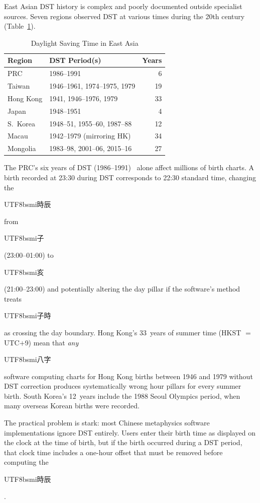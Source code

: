 \documentclass[10pt,a4paper]{article}
\newcommand{\zh}[1]{\begin{CJK}{UTF8}{bsmi}#1\end{CJK}}
\begin{document}
East Asian DST history is complex and poorly documented outside
specialist sources.  Seven regions observed DST at various times during
the 20th century~\cite{iana_tzdata_asia, dst_east_asia_research}
(Table~\ref{tab:dst_history}).

\begin{table}[H]
\centering
\caption{Daylight Saving Time in East Asia}
\label{tab:dst_history}
\small
\begin{tabular}{@{}llr@{}}
\toprule
\textbf{Region} & \textbf{DST Period(s)} & \textbf{Years} \\
\midrule
PRC             & 1986--1991                              & 6  \\
Taiwan          & 1946--1961, 1974--1975, 1979             & 19 \\
Hong Kong       & 1941, 1946--1976, 1979                   & 33 \\
Japan           & 1948--1951                               & 4  \\
S.\ Korea       & 1948--51, 1955--60, 1987--88              & 12 \\
Macau           & 1942--1979 (mirroring HK)                & 34 \\
Mongolia        & 1983--98, 2001--06, 2015--16             & 27 \\
\bottomrule
\end{tabular}
\end{table}

\noindent
The PRC's six years of DST (1986--1991)~\cite{prc_dst_regulation,
iana_tzdata_asia} alone affect millions
of birth charts.  A birth recorded at 23:30 during DST corresponds to 22:30 standard
time, changing the \zh{時辰} from \zh{子} (23:00--01:00) to \zh{亥}
(21:00--23:00) and potentially altering the day pillar if the software's
method treats \zh{子時} as crossing the day boundary.  Hong Kong's 33~years
of summer time (HKST $=$ UTC$+$9) mean that \emph{any} \zh{八字}
software computing charts for Hong Kong births between 1946 and 1979
without DST correction produces systematically wrong hour pillars for every
summer birth.  South Korea's 12~years include the 1988 Seoul Olympics
period, when many overseas Korean births were recorded.

The practical problem is stark: most Chinese metaphysics software
implementations ignore DST entirely.  Users enter their birth time as displayed on the
clock at the time of birth, but if the birth occurred during a DST period,
that clock time includes a one-hour offset that must be removed before
computing the \zh{時辰}.
\end{document}
